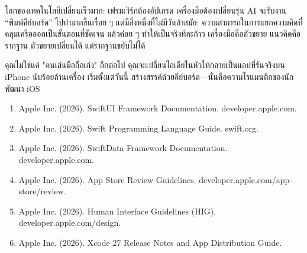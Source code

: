 โลกของเทคโนโลยีเปลี่ยนเร็วมาก: เฟรมเวิร์กต้องอัปเกรด เครื่องมือต้องเปลี่ยนรุ่น AI จะรับงาน “พิมพ์คีย์บอร์ด” ไปทำมากขึ้นเรื่อย ๆ แต่มีสิ่งหนึ่งที่ไม่มีวันล้าสมัย: ความสามารถในการแยกความคิดที่คลุมเครือออกเป็นขั้นตอนที่ชัดเจน แล้วค่อย ๆ ทำให้เป็นจริงทีละก้าว เครื่องมือคือตัวขยาย แนวคิดคือรากฐาน ตัวขยายเปลี่ยนได้ แต่รากฐานขยับไม่ได้

คุณไม่ใช่แค่ "คนเล่นมือถือเก่ง" อีกต่อไป คุณจะเปลี่ยนไอเดียในหัวให้กลายเป็นแอปที่รันจริงบน iPhone นับร้อยล้านเครื่อง เริ่มตั้งแต่วันนี้ สร้างสรรค์ด้วยคีย์บอร์ด—นั่นคือความโรแมนติกของนักพัฒนา iOS


\begin{enumerate}
  \item Apple Inc. (2026). SwiftUI Framework Documentation. developer.apple.com.
  \item Apple Inc. (2026). Swift Programming Language Guide. swift.org.
  \item Apple Inc. (2026). SwiftData Framework Documentation. developer.apple.com.
  \item Apple Inc. (2026). App Store Review Guidelines. developer.apple.com/app-store/review.
  \item Apple Inc. (2026). Human Interface Guidelines (HIG). developer.apple.com/design.
  \item Apple Inc. (2026). Xcode 27 Release Notes and App Distribution Guide.
\end{enumerate}
